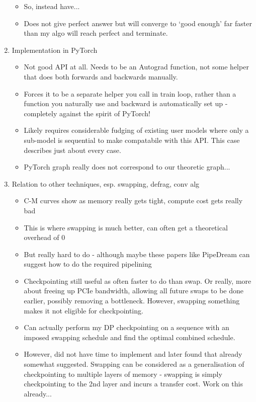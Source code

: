 \begin{enumerate}
\begin{itemize}
        \item So, instead have...
        \item Does not give perfect answer but will converge to `good enough' far faster than my algo will reach perfect and terminate.
    \end{itemize}
    \item Implementation in PyTorch
    \begin{itemize}
        \item Not good API at all. Needs to be an Autograd function, not some helper that does both forwards and backwards manually.
        \item Forces it to be a separate helper you call in train loop, rather than a function you naturally use and backward is automatically set up - completely against the spirit of PyTorch!
        \item Likely requires considerable fudging of existing user models where only a sub-model is sequential to make compatabile with this API. This case describes just about every case.
        \item PyTorch graph really does not correspond to our theoretic graph...
    \end{itemize}
    \item Relation to other techniques, esp. swapping, defrag, conv alg 
    \begin{itemize}
        \item C-M curves show as memory really gets tight, compute cost gets really bad
        \item This is where swapping is much better, can often get a theoretical overhead of 0
        \item But really hard to do - although maybe these papers like PipeDream can suggest how to do the required pipelining
        \item Checkpointing still useful as often faster to do than swap. Or really, more about freeing up PCIe bandwidth, allowing all future swaps to be done earlier, possibly removing a bottleneck. However, swapping something makes it not eligible for checkpointing.
        \item Can actually perform my DP checkpointing on a sequence with an imposed swapping schedule and find the optimal combined schedule.
        \item However, did not have time to implement and later found that already somewhat suggested.
        Swapping can be considered as a generalisation of checkpointing to multiple layers of memory - swapping is simply checkpointing to the 2nd layer and incurs a transfer cost. Work on this already...

\end{itemize}
\end{enumerate}
